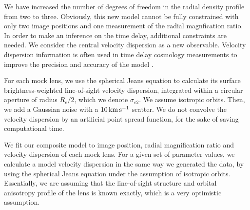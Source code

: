 \documentclass[usenatbib]{mnras}
\def\reff{R_e}
\def\sigmae{\sigma_{e2}}
\begin{document}
We have increased the number of degrees of freedom in the radial density profile from two to three.
Obviously, this new model cannot be fully constrained with only two image positions and one measurement of the radial magnfication ratio.
In order to make an inference on the time delay, additional constraints are needed.
We consider the central velocity dispersion as a new observable.
Velocity dispersion information is often used in time delay cosmology measurements to improve the precision and accuracy of the model \citep{Suy++14,Won++17}.

For each mock lens, we use the spherical Jeans equation to calculate its surface brightness-weighted line-of-sight velocity dispersion, integrated within a circular aperture of radius $\reff/2$, which we denote $\sigmae$. We assume isotropic orbits. Then, we add a Gaussian noise with a $10\,\rm{km}\,{s}^{-1}$ scatter. We do not convolve the velocity dispersion by an artificial point spread function, for the sake of saving computational time.

We fit our composite model to image position, radial magnification ratio and velocity dispersion of each mock lens. For a given set of parameter values, we calculate a model velocity dispersion in the same way we generated the data, by using the spherical Jeans equation under the assumption of isotropic orbits. Essentially, we are assuming that the line-of-sight structure and orbital anisotropy profile of the lens is known exactly, which is a very optimistic assumption.
\end{document}
